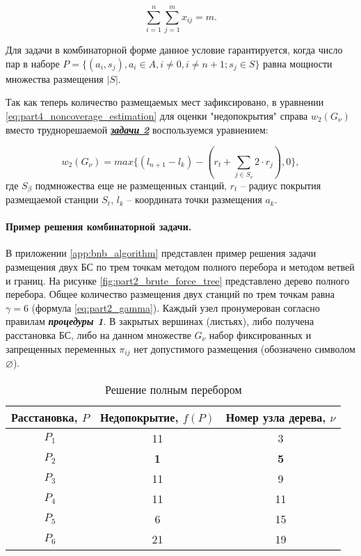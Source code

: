 \begin{equation}
  \label{eq:part3_placed_all_station}
  \sum\limits_{i=1}^n \sum\limits_{j=1}^m x_{ij} = m.
\end{equation}

Для задачи в комбинаторной форме данное условие гарантируется, когда число пар в наборе $P = \{ (a_i, s_j), a_i \in A, i \neq 0, i \neq n + 1; s_j \in S\}$ равна мощности множества размещения $|S|$. 

Так как теперь количество размещаемых мест зафиксировано, в уравнении \cref{eq:part4_noncoverage_estimation} для оценки "недопокрытия" справа $w_2 \left(G_\nu \right)$ вместо труднорешаемой \underline{\textit{\textbf{задачи 2}}} воспользуемся уравнением:

\begin{equation}\label{eq2}
  w_2 \left(G_\nu \right) = max\{\left(l_{n+1}-l_k\right)-(r_t+\sum_{j\in S_v}{2 \cdot r_j}),0\},
\end{equation}
где $S_\beta$ подмножества еще не размещенных станций, $r_t$ -- радиус покрытия размещаемой станции $S_t$, $l_k$ -- координата точки размещения $a_k$.

\paragraph{Пример решения комбинаторной задачи.}

В приложении \cref{app:bnb_algorithm} представлен пример решения задачи размещения двух БС  по трем точкам методом полного перебора и методом ветвей и границ. На рисунке \cref{fig:part2_brute_force_tree} представлено дерево полного перебора. Общее количество размещения двух станций по трем точкам равна $\gamma = 6$ (формула \cref{eq:part2_gamma}). Каждый узел пронумерован согласно правилам \textit{\textbf{процедуры 1}}. В закрытых вершинах (листьях), либо получена расстановка БС, либо на данном множестве $G_\nu$ набор фиксированных и запрещенных переменных $\pi_{ij}$ нет допустимого размещения (обозначено символом $\varnothing$).

\begin{table}[h!]\centering
  \begin{tabular}{|c|c|c|}\hline
      
      Расстановка, $P$ & Недопокрытие, $f(P)$ & Номер узла дерева, $\nu$\\
      \hline
      $P_1$ & 11 & 3\\
      \textit{\textbf{$P_2$}} & \textbf{1} & \textbf{5}\\
      $P_3$ & 11 & 9\\
      $P_4$ & 11 & 11\\
      $P_5$ & 6 & 15\\
      $P_6$ & 21 & 19\\
      \hline

\end{tabular}\caption{Решение полным перебором}\label{tab:brute_force_solution}
\end{table}

